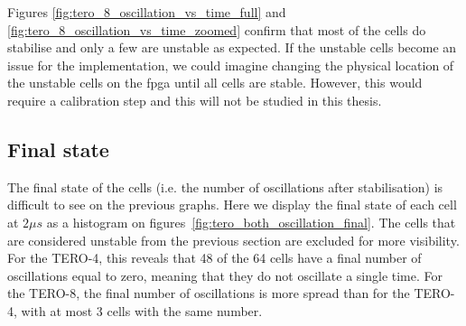 Figures \ref{fig:tero_8_oscillation_vs_time_full} and \ref{fig:tero_8_oscillation_vs_time_zoomed} confirm that most of the cells do stabilise and only a few are unstable as expected. If the unstable cells become an issue for the implementation, we could imagine changing the physical location of the unstable cells on the \acrshort{fpga} until all cells are stable. However, this would require a calibration step and this will not be studied in this thesis.


\subsection{Final state}

The final state of the cells (i.e. the number of oscillations after stabilisation) is difficult to see on the previous graphs. Here we display the final state of each cell at $2\mu s$ as a histogram on figures~\ref{fig:tero_both_oscillation_final}. The cells that are considered unstable from the previous section are excluded for more visibility.\\

For the TERO-4, this reveals that 48 of the 64 cells have a final number of oscillations equal to zero, meaning that they do not oscillate a single time. For the TERO-8, the final number of oscillations is more spread than for the TERO-4, with at most 3 cells with the same number.

